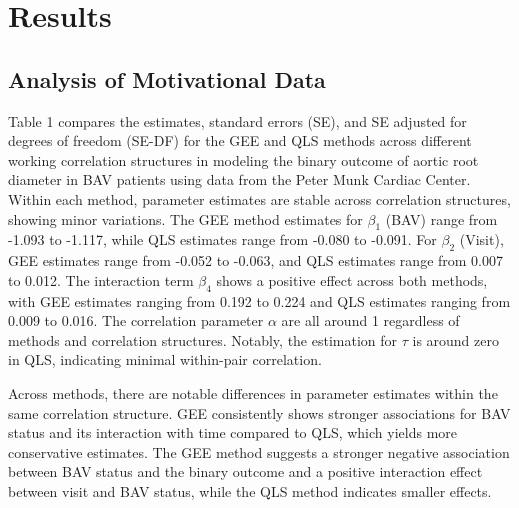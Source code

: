 \documentclass[
]{aft}
\begin{document}
\section{Results}\label{results}

\subsection{Analysis of Motivational
Data}\label{analysis-of-motivational-data}

Table 1 compares the estimates, standard errors (SE), and SE adjusted
for degrees of freedom (SE-DF) for the GEE and QLS methods across
different working correlation structures in modeling the binary outcome
of aortic root diameter in BAV patients using data from the Peter Munk
Cardiac Center. Within each method, parameter estimates are stable
across correlation structures, showing minor variations. The GEE method
estimates for \(\beta_1\) (BAV) range from -1.093 to -1.117, while QLS
estimates range from -0.080 to -0.091. For \(\beta_2\) (Visit), GEE
estimates range from -0.052 to -0.063, and QLS estimates range from
0.007 to 0.012. The interaction term \(\beta_4\) shows a positive effect
across both methods, with GEE estimates ranging from 0.192 to 0.224 and
QLS estimates ranging from 0.009 to 0.016. The correlation parameter
\(\alpha\) are all around 1 regardless of methods and correlation
structures. Notably, the estimation for \(\tau\) is around zero in QLS,
indicating minimal within-pair correlation.

Across methods, there are notable differences in parameter estimates
within the same correlation structure. GEE consistently shows stronger
associations for BAV status and its interaction with time compared to
QLS, which yields more conservative estimates. The GEE method suggests a
stronger negative association between BAV status and the binary outcome
and a positive interaction effect between visit and BAV status, while
the QLS method indicates smaller effects.
\end{document}
